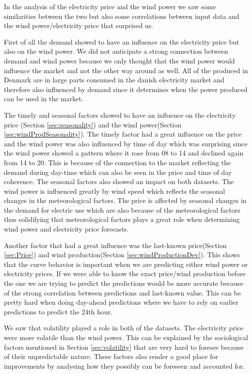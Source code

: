 In the analysis of the electricity price and the wind power we saw some similarities between the two but also some correlations between input data and the wind power/electricity price that surprised us.

First of all the demand showed to have an influence on the electricity price but also on the wind power. We did not anticipate a strong connection between demand and wind power because we only thought that the wind power would influence the market and not the other way around as well. All of the  produced in Denmark are in large parts consumed in the danish electricity market and therefore also influenced by demand since it determines when the power produced can be used in the market.

The timely and seasonal factors showed to have an influence on the electricity price (Section \ref{sec:seasonality}) and the wind power(Section \ref{sec:windProdSeasonality}). The timely factor had a great influence on the price and the wind power was also influenced by time of day which was surprising since the wind power showed a pattern where it rose from 08 to 14 and declined again from 14 to 20. This is because of the connection to the market reflecting the demand during day-time which can also be seen in the price and time of day coherence. The seasonal factors also showed an impact on both datasets. The wind power is influenced greatly by wind speed which reflects the seasonal changes in the meteorological factors. The price is affected by seasonal changes in the demand for electric use which are also because of the meteorological factors thus solidifying that meteorological factors plays a great role when determining wind power and electricity price forecasts.

Another factor that had a great influence was the last-known price(Section \ref{sec:Price}) and wind production(Section \ref{sec:windProductionDev}). This shows that the curve behavior is important when we are predicting either wind power or electricity prices. If we were able to know the exact price/wind production before the one we are trying to predict the predictions would be more accurate because of the strong correlation between predictions and last-known value. This can be pretty hard when doing day-ahead predictions where we have to rely on earlier predictions to predict the 24th hour.

We saw that volatility played a role in both of the datasets. The electricity price were more volatile than the wind power. This can be explained by the sociological factors mentioned in Section \ref{sec:volatility} that are very hard to foresee because of their unpredictable nature. These factors also render a good place for improvements by analysing how they possibly can be foreseen and accounted for.

